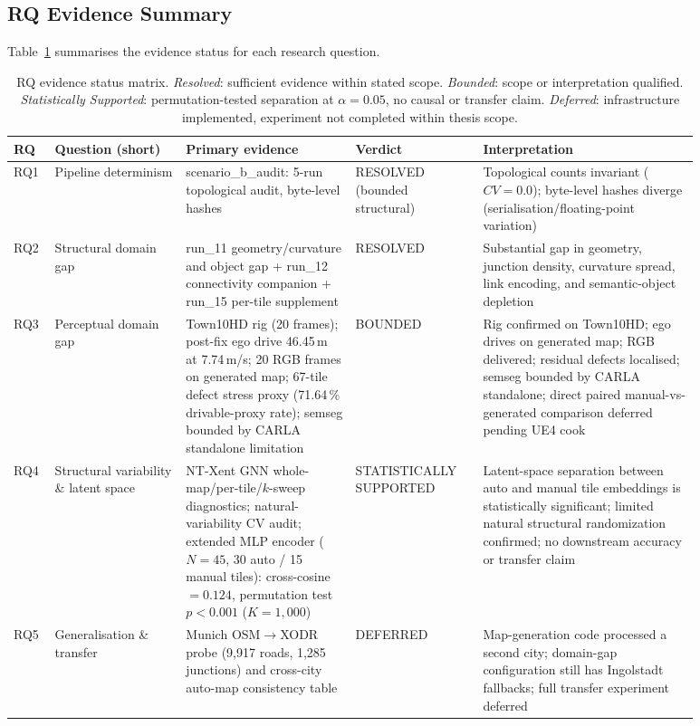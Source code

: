\subsection{RQ Evidence Summary}
\label{sec:rq_verdict_matrix}

Table~\ref{tab:rq_verdict_matrix} summarises the evidence status for each research question.

\begin{table}[htbp]
\centering
\scriptsize
\begin{tabular}{@{}p{0.04\linewidth}p{0.17\linewidth}p{0.22\linewidth}p{0.16\linewidth}p{0.29\linewidth}@{}}
\hline
\textbf{RQ} & \textbf{Question (short)} & \textbf{Primary evidence} & \textbf{Verdict} & \textbf{Interpretation} \\
\hline
RQ1 & Pipeline determinism & scenario\_b\_audit: 5-run topological audit, byte-level hashes & RESOLVED (bounded structural) & Topological counts invariant ($CV\!=\!0.0$); byte-level hashes diverge (serialisation/floating-point variation) \\
RQ2 & Structural domain gap & run\_11 geometry/curvature and object gap + run\_12 connectivity companion + run\_15 per-tile supplement & RESOLVED & Substantial gap in geometry, junction density, curvature spread, link encoding, and semantic-object depletion \\
RQ3 & Perceptual domain gap & Town10HD rig (20 frames); post-fix ego drive 46.45\,m at 7.74\,m/s; 20 RGB frames on generated map; 67-tile defect stress proxy (71.64\,\% drivable-proxy rate); semseg bounded by CARLA standalone limitation & BOUNDED & Rig confirmed on Town10HD; ego drives on generated map; RGB delivered; residual defects localised; semseg bounded by CARLA standalone; direct paired manual-vs-generated comparison deferred pending UE4 cook \\
RQ4 & Structural variability \& latent space & NT-Xent GNN whole-map/per-tile/$k$-sweep diagnostics; natural-variability CV audit; extended MLP encoder ($N\!=\!45$, 30 auto / 15 manual tiles): cross-cosine $\!=\!0.124$, permutation test $p\!<\!0.001$ ($K\!=\!1{,}000$) & STATISTICALLY SUPPORTED & Latent-space separation between auto and manual tile embeddings is statistically significant; limited natural structural randomization confirmed; no downstream accuracy or transfer claim \\
RQ5 & Generalisation \& transfer & Munich OSM$\rightarrow$XODR probe (9,917 roads, 1,285 junctions) and cross-city auto-map consistency table & DEFERRED & Map-generation code processed a second city; domain-gap configuration still has Ingolstadt fallbacks; full transfer experiment deferred \\
\hline
\end{tabular}
\caption[RQ evidence status matrix.]{RQ evidence status matrix. \emph{Resolved}: sufficient evidence within stated scope. \emph{Bounded}: scope or interpretation qualified. \emph{Statistically Supported}: permutation-tested separation at $\alpha=0.05$, no causal or transfer claim. \emph{Deferred}: infrastructure implemented, experiment not completed within thesis scope.}
\label{tab:rq_verdict_matrix}
\end{table}

